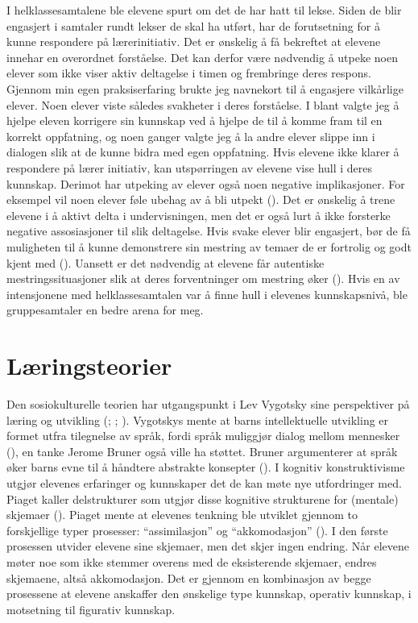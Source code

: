 \documentclass[12pt,twoside,onecolumn,norsk]{article}
\begin{document}
I helklassesamtalene ble elevene spurt om det de har hatt til lekse.
Siden de blir engasjert i samtaler rundt lekser de skal ha utført, har de forutsetning for å kunne 
respondere på lærerinitiativ. Det er ønskelig å få bekreftet at elevene innehar en overordnet 
forståelse. Det kan derfor være nødvendig å utpeke noen elever som ikke viser aktiv deltagelse i 
timen og frembringe deres respons. Gjennom min egen praksiserfaring brukte jeg navnekort
til å engasjere vilkårlige elever. Noen elever viste således svakheter i deres forståelse.
I blant valgte jeg å hjelpe eleven korrigere sin kunnskap ved å hjelpe de til å komme
fram til en korrekt oppfatning, og noen ganger valgte jeg å la andre elever slippe inn i dialogen
slik at de kunne bidra med egen oppfatning.
\newline
\newline
Hvis elevene ikke klarer å respondere på lærer initiativ, kan utspørringen av elevene vise hull 
i deres kunnskap. Derimot har utpeking av elever også noen negative implikasjoner. For eksempel 
vil noen elever føle ubehag av å bli utpekt (). Det er ønskelig å trene 
elevene i å aktivt delta i undervisningen, men det er også lurt å ikke forsterke negative 
assosiasjoner til slik deltagelse. Hvis svake elever blir engasjert, bør de få muligheten til å 
kunne demonstrere sin mestring av temaer de er fortrolig og godt kjent med (). 
Uansett er det nødvendig at elevene får autentiske mestringssituasjoner slik at deres forventninger
om mestring øker (). Hvis en av intensjonene med helklassesamtalen var å 
finne hull i elevenes kunnskapsnivå, ble gruppesamtaler en bedre arena for meg.

\section*{Læringsteorier}
Den sosiokulturelle teorien har utgangspunkt 
i Lev Vygotsky sine perspektiver på læring og utvikling (; ; 
). Vygotskys mente at barns 
intellektuelle utvikling er formet utfra tilegnelse av språk, fordi språk muliggjør dialog mellom 
mennesker (), en tanke Jerome Bruner også ville ha støttet. Bruner argumenterer 
at språk øker barns evne til å håndtere abstrakte konsepter ().
\newline
\newline
I kognitiv konstruktivisme utgjør elevenes erfaringer og kunnskaper det de kan møte nye 
utfordringer med. Piaget kaller delstrukturer som utgjør disse kognitive strukturene 
for (mentale) skjemaer (). Piaget mente at elevenes tenkning ble 
utviklet gjennom to forskjellige typer prosesser: ``assimilasjon'' og ``akkomodasjon'' 
(). I den første prosessen utvider elevene sine skjemaer, men
det skjer ingen endring. Når elevene møter noe som ikke stemmer overens med de
eksisterende skjemaer, endres skjemaene, altså akkomodasjon. Det er gjennom en 
kombinasjon av begge prosessene at elevene anskaffer den ønskelige type kunnskap,
operativ kunnskap, i motsetning til figurativ kunnskap.
\end{document}
